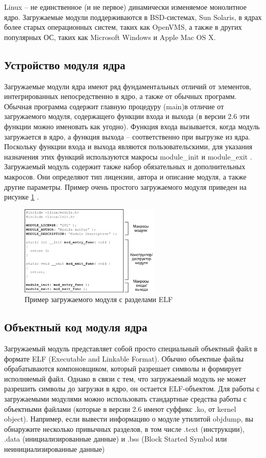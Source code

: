 Linux – не единственное (и не первое) динамически изменяемое монолитное ядро. Загружаемые модули поддерживаются в BSD-системах, Sun Solaris, в ядрах более старых операционных систем, таких как OpenVMS, а также в других популярных ОС, таких как Microsoft Windows и Apple Mac OS X.
\subsection{Устройство модуля ядра}
Загружаемые модули ядра имеют ряд фундаментальных отличий от элементов, интегрированных непосредственно в ядро, а также от обычных программ. Обычная программа содержит главную процедуру (main)в отличие от загружаемого модуля, содержащего функции входа и выхода (в версии 2.6 эти функции можно именовать как угодно). Функция входа вызывается, когда модуль загружается в ядро, а функция выхода – соответственно при выгрузке из ядра. Поскольку функции входа и выхода являются пользовательскими, для указания назначения этих функций используются макросы module\_init и module\_exit . Загружаемый модуль содержит также набор обязательных и дополнительных макросов. Они определяют тип лицензии, автора и описание модуля, а также другие параметры. Пример очень простого загружаемого модуля приведен на рисунке  \ref{fig:an01} .
\begin{figure}[h!]
	\centering
	\includegraphics[width=0.6\textwidth]{img/1.png}
	\caption{Пример загружаемого модуля с разделами ELF}
	\label{fig:an01}
\end{figure}
\subsection{Объектный код модуля ядра}
Загружаемый модуль представляет собой просто специальный объектный файл в формате ELF (Executable and Linkable Format). Обычно объектные файлы обрабатываются компоновщиком, который разрешает символы и формирует исполняемый файл. Однако в связи с тем, что загружаемый модуль не может разрешить символы до загрузки в ядро, он остается ELF-объектом. Для работы с загружаемыми модулями можно использовать стандартные средства работы с объектными файлами (которые в версии 2.6 имеют суффикс .ko, от kernel object). Например, если вывести информацию о модуле утилитой objdump, вы обнаружите несколько привычных разделов, в том числе .text (инструкции), .data (инициализированные данные) и .bss (Block Started Symbol или неинициализированные данные)\cite{book4}

